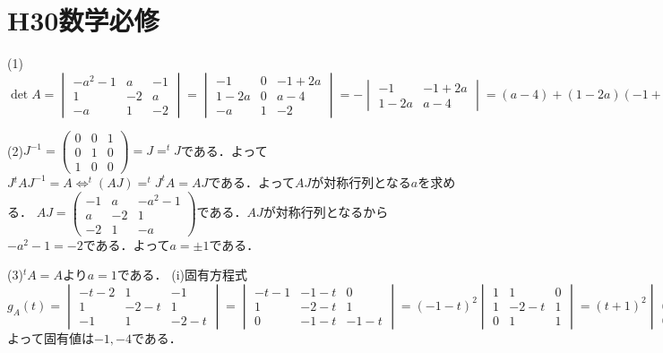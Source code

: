 \documentclass[
		book,
		head_space=20mm,
		foot_space=20mm,
		gutter=10mm,
		line_length=190mm
]{jlreq}
\begin{document}
\section{H30数学必修}
(1)
$\det A= \begin{vmatrix}
    -a^2-1 & a & -1 \\
    1 & -2 & a \\
    -a & 1 & -2
\end{vmatrix}=\begin{vmatrix}
    -1 & 0 & -1+2a \\
    1-2a & 0 & a-4 \\
    -a & 1 & -2
\end{vmatrix}=-\begin{vmatrix}
    -1 & -1+2a \\
    1-2a & a-4
    \end{vmatrix}=(a-4)+(1-2a)(-1+2a)=-4a^2+5a-5$
    
(2)$J^{-1}=\begin{pmatrix}
    0 & 0 & 1 \\
    0 & 1 & 0 \\
    1 & 0 & 0
    \end{pmatrix}=J=^t\!J$である．よって
$J{}^t\! AJ^{-1}=A\Leftrightarrow^t\!(AJ)=^t\!J ^t\!A =AJ$である．よって$AJ$が対称行列となる$a$を求める．
$AJ=\begin{pmatrix}
    -1 & a & -a^2-1 \\
    a & -2 & 1 \\
    -2 & 1 & -a 
    \end{pmatrix}$である．$AJ$が対称行列となるから$-a^2-1=-2$である．よって$a=\pm{1}$である．

(3)$^tA=A$より$a=1$である．
(i)固有方程式$g_A(t)=\begin{vmatrix}
    -t-2 & 1 & -1 \\
    1 & -2-t & 1 \\
    -1 & 1 & -2-t
\end{vmatrix}=\begin{vmatrix}
    -t-1 & -1-t & 0 \\
    1 & -2-t & 1 \\
    0 & -1-t & -1-t
    \end{vmatrix}=(-1-t)^2\begin{vmatrix}
        1 & 1 & 0 \\
        1 & -2-t & 1 \\
        0 & 1 & 1
    \end{vmatrix}=(t+1)^2\begin{vmatrix}
        1 & 1 & 0 \\
        0 & -3-t & 1 \\
        0 & 1 & 1
        \end{vmatrix}=(t+1)^2(-3-t-1)=-(t+1)^2(t+4)$
        よって固有値は$-1,-4$である．
\end{document}

